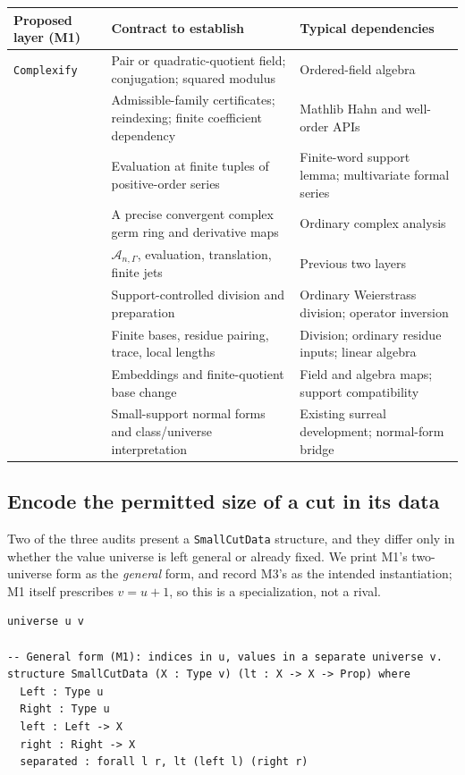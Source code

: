 \documentclass[11pt,letterpaper]{article}
\numberwithin{equation}{section}
\theoremstyle{definition}
\theoremstyle{remark}
\newcommand{\Ag}{\mathscr A}
\begin{document}
\begin{longtable}{@{}P{0.24\textwidth}P{0.40\textwidth}P{0.28\textwidth}@{}}
\toprule
Proposed layer (M1) & Contract to establish & Typical dependencies\\
\midrule\endhead
\texttt{Complexify} & Pair or quadratic-quotient field; conjugation; squared modulus & Ordered-field algebra\\[0.35em]
 & Admissible-family certificates; reindexing; finite coefficient dependency & Mathlib Hahn and well-order APIs\\[0.35em]
 & Evaluation at finite tuples of positive-order series & Finite-word support lemma; multivariate formal series\\[0.35em]
 & A precise convergent complex germ ring and derivative maps & Ordinary complex analysis\\[0.35em]
 & $\Ag_{n,\Gamma}$, evaluation, translation, finite jets & Previous two layers\\[0.35em]
 & Support-controlled division and preparation & Ordinary Weierstrass division; operator inversion\\[0.35em]
 & Finite bases, residue pairing, trace, local lengths & Division; ordinary residue inputs; linear algebra\\[0.35em]
 & Embeddings and finite-quotient base change & Field and algebra maps; support compatibility\\[0.35em]
 & Small-support normal forms and class/universe interpretation & Existing surreal development; normal-form bridge\\
\bottomrule
\end{longtable}

\subsection{Encode the permitted size of a cut in its data}
\label{found:sub:cutdata}
Two of the three audits present a \texttt{SmallCutData} structure, and they
differ only in whether the value universe is left general or already fixed. We
print M1's two-universe form as the \emph{general} form, and record M3's as the
intended instantiation; M1 itself prescribes $v=u+1$, so this is a
specialization, not a rival.

\begin{samepage}
\begin{lstlisting}
universe u v

-- General form (M1): indices in u, values in a separate universe v.
structure SmallCutData (X : Type v) (lt : X -> X -> Prop) where
  Left : Type u
  Right : Type u
  left : Left -> X
  right : Right -> X
  separated : forall l r, lt (left l) (right r)
\end{lstlisting}
\end{samepage}
\end{document}
